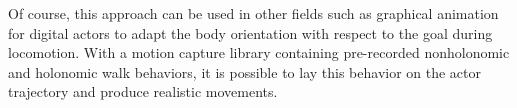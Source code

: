 Of course, this approach can be used in other fields such as graphical
animation for digital actors to adapt the body orientation with respect
to the goal during locomotion. With a motion capture library
containing pre-recorded nonholonomic and holonomic walk behaviors, it
is possible to lay this behavior on the actor trajectory and produce
realistic movements.
